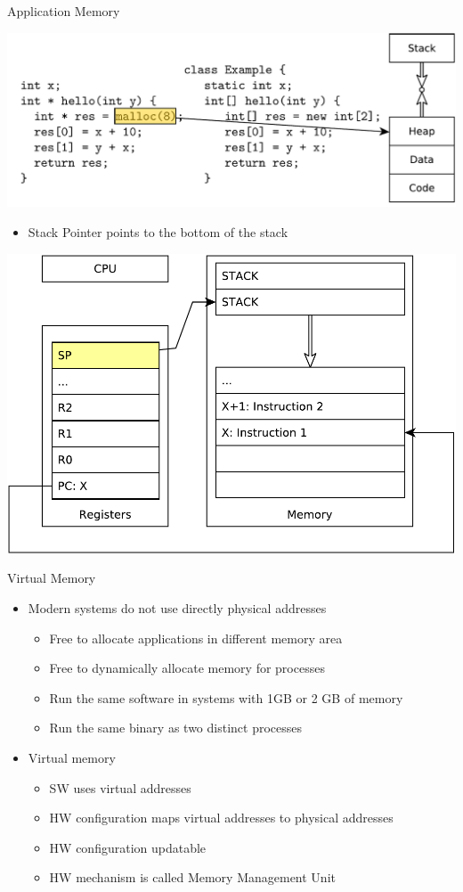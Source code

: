 \documentclass{beamer}
\begin{document}
\begin{frame}[t]{Application Memory}
{{}
     {
  \includegraphics[width=0.9\linewidth]{code6}
}
     {
  \begin{itemize}
    \item Stack Pointer points to the bottom of the stack
      \\[20pt]
  \end{itemize}
  \includegraphics[width=0.6\linewidth]{stack}
}}
\end{frame}



\begin{frame}{Virtual Memory}
  \begin{itemize}
  \item Modern systems do not use directly physical addresses
    \begin{itemize}
    \item Free to allocate applications in different memory area
    \item Free to dynamically allocate memory for processes
    \item Run the same software in systems with 1GB or 2 GB of memory
    \item Run the same binary as two distinct processes
    \end{itemize}
  \item<2-> Virtual memory
    \begin{itemize}
    \item SW uses virtual addresses
    \item HW configuration maps virtual addresses to physical addresses
    \item HW configuration updatable
    \item HW mechanism is called Memory Management Unit
    \end{itemize}
  \end{itemize}
\end{frame}
\end{document}
